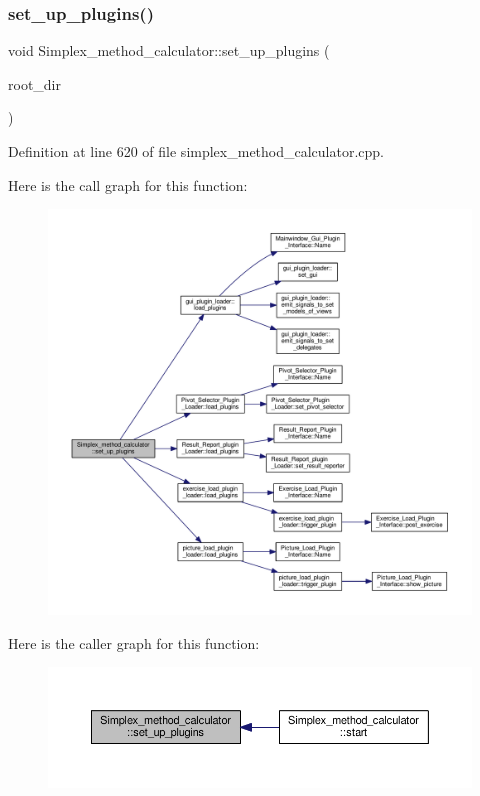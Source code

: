 \subsubsection{\texorpdfstring{set\+\_\+up\+\_\+plugins()}{set\_up\_plugins()}}
{\footnotesize\ttfamily void Simplex\+\_\+method\+\_\+calculator\+::set\+\_\+up\+\_\+plugins (\begin{DoxyParamCaption}\item[{const Q\+Dir \&}]{root\+\_\+dir }\end{DoxyParamCaption})\hspace{0.3cm}{\ttfamily [private]}}



Definition at line 620 of file simplex\+\_\+method\+\_\+calculator.\+cpp.

Here is the call graph for this function\+:\nopagebreak
\begin{figure}[H]
\begin{center}
\leavevmode
\includegraphics[width=350pt]{classSimplex__method__calculator_a18e84030946336020d9656ac4baf96d9_cgraph}
\end{center}
\end{figure}
Here is the caller graph for this function\+:\nopagebreak
\begin{figure}[H]
\begin{center}
\leavevmode
\includegraphics[width=350pt]{classSimplex__method__calculator_a18e84030946336020d9656ac4baf96d9_icgraph}
\end{center}
\end{figure}
